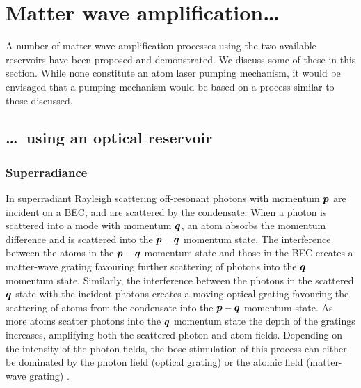 \section{Matter wave amplification\dots}

A number of matter-wave amplification processes using the two available reservoirs have been proposed and demonstrated.  We discuss some of these in this section.  While none constitute an atom laser pumping mechanism, it would be envisaged that a pumping mechanism would be based on a process similar to those discussed. 

\subsection{\dots\ using an optical reservoir}

\subsubsection{Superradiance}
In superradiant Rayleigh scattering \cite{Dicke:1954,Rehler:1971,Inouye:1999yq,Moore:1999uq,Piovella:2001fj} off-resonant photons with momentum $\bm{p}$ are incident on a BEC, and are scattered by the condensate. When a photon is scattered into a mode with momentum $\bm{q}$, an atom absorbs the momentum difference and is scattered into the $\bm{p}-\bm{q}$ momentum state. The interference between the atoms in the $\bm{p}-\bm{q}$ momentum state and those in the BEC creates a matter-wave grating favouring further scattering of photons into the $\bm{q}$ momentum state. Similarly, the interference between the photons in the scattered $\bm{q}$ state with the incident photons creates a moving optical grating favouring the scattering of atoms from the condensate into the $\bm{p}-\bm{q}$ momentum state.  As more atoms scatter photons into the $\bm{q}$ momentum state the depth of the gratings increases, amplifying both the scattered photon and atom fields. Depending on the intensity of the photon fields, the bose-stimulation of this process can either be dominated by the photon field (optical grating) or the atomic field (matter-wave grating) \cite{Schneble:2003hb}.


